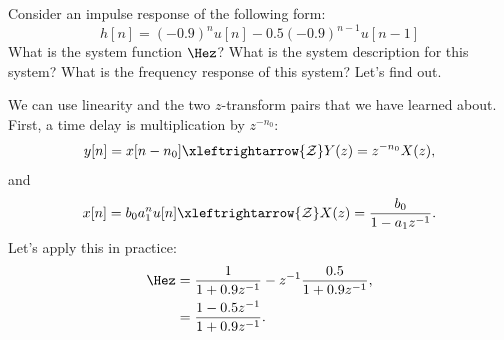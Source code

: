Consider an impulse response of the following form:
\begin{equation}
h[n] = (-0.9)^n u[n] - 0.5(-0.9)^{n-1} u[n-1]
\label{eq:ex_ir}
\end{equation}
What is the system function $\Hez$? What is the system description for
this system? What is the frequency response of this system? Let's find out.

We can use linearity and the two $z$-transform pairs that we have
learned about. First, a time delay is multiplication by $z^{-n_0}$:
\begin{equation}
y[n] = x[n-n_0] \xleftrightarrow{\mathcal{Z}} Y(z) = z^{-n_0}X(z),
\end{equation}
and 
\begin{equation}
x[n] = b_0 a_1^n u[n] \xleftrightarrow{\mathcal{Z}} X(z) = \frac{b_0}{1-a_1 z^{-1}}.
\end{equation}
Let's apply this in practice:
\begin{align}
\Hez &= \frac{1}{1+0.9 z^{-1}} - z^{-1}\frac{0.5}{1+ 0.9 z^{-1}},\\
     &= \frac{1-0.5z^{-1}}{1+0.9 z^{-1}} \label{eq:coeffs_read}.
\end{align}
